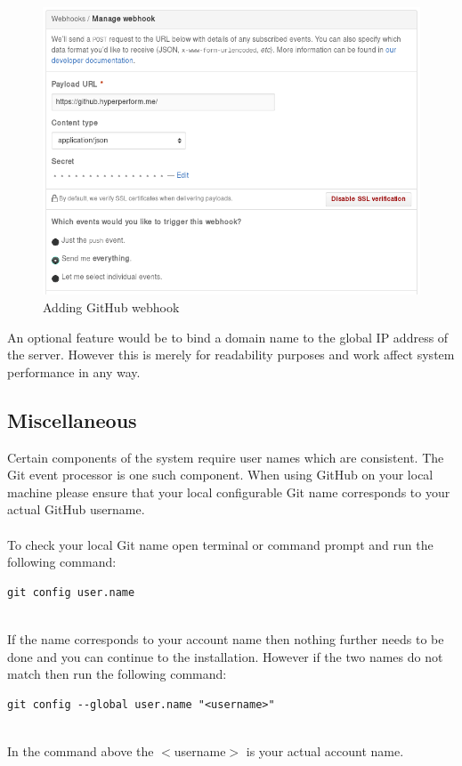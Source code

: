 \documentclass[11pt,a4paper]{article}
\begin{document}
\begin{figure}[H]
	\includegraphics[width=\linewidth]{../Images/gitWebhook}
	\caption{Adding GitHub webhook}
\end{figure}

An optional feature would be to bind a domain name to the global IP address of the server. However this is merely for readability purposes and work affect system performance in any way.

\subsection{Miscellaneous}

Certain components of the system require user names which are consistent. The Git event processor is one such component. When using GitHub on your local machine please ensure that your local configurable Git name corresponds to your actual GitHub username. \\ \\
To check your local Git name open terminal or command prompt and run the following command: 

\begin{lstlisting}
git config user.name
\end{lstlisting} 
~\\
If the name corresponds to your account name then nothing further needs to be done and you can continue to the installation. However if the two names do not match then run the following command:

\begin{lstlisting}
git config --global user.name "<username>"
\end{lstlisting}
~\\
In the command above the $<$username$>$ is your actual account name.
\end{document}

